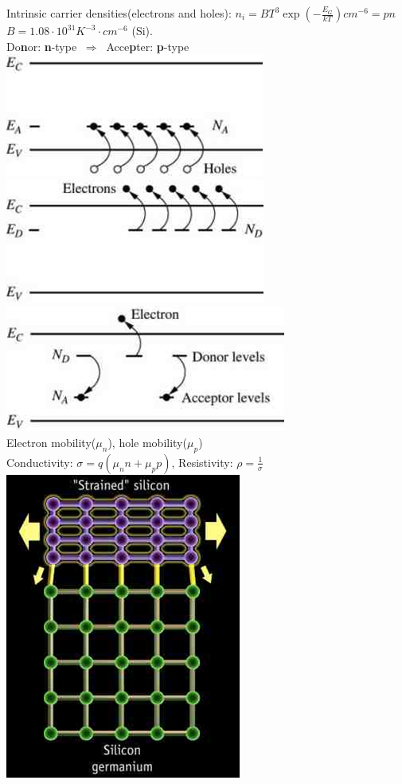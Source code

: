 \documentclass[12pt,a4paper]{article}
\newcommand{\ds}{\displaystyle}
\newcommand{\To}{\ \Rightarrow\ }
\begin{document}
\noindent Intrinsic carrier densities(electrons and holes): 
$\ds n_i = BT^3 \exp(-\frac{E_G}{kT}) cm^{-6} = pn$\\
$\ds B = 1.08\cdot10^31K^{-3}\cdot cm^{-6}$ (Si).\\
Do\textbf{n}or: \textbf{n}-type $\To$ Acce\textbf{p}ter: \textbf{p}-type\\
\includegraphics[scale=.5]{acceptor.png}
\includegraphics[scale=.5]{donor.png}
\includegraphics[scale=.5]{band.png}\\
Electron mobility($\mu_n$), hole mobility($\mu_p$)\\
Conductivity: $\ds\sigma = q(\mu_nn+\mu_pp)$,
Resistivity: $\ds\rho = \frac{1}{\sigma}$\\
\includegraphics[scale=.5]{strained_si.png}\\
\end{document}
